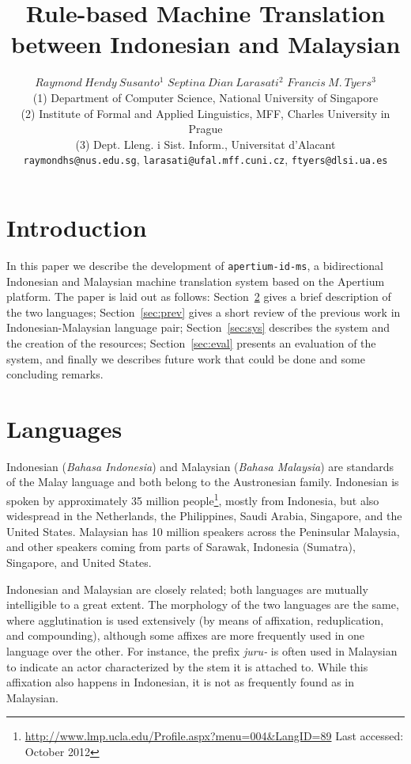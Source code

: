 \documentclass[10pt,a5paper,twoside]{article}
\title{Rule-based Machine Translation between Indonesian and Malaysian}
\author{$Raymond~Hendy~Susanto^{1}$
    $Septina~Dian~Larasati^{2}$
    $Francis~M.~Tyers^{3}$ \\
{\small  	(1) Department of Computer Science, National University of Singapore\\
(2) Institute of Formal and Applied Linguistics, MFF, Charles University in Prague\\
(3) Dept. Lleng. i Sist. Inform., Universitat d’Alacant\\
  \texttt{raymondhs@nus.edu.sg}, \texttt{larasati@ufal.mff.cuni.cz}, \texttt{ftyers@dlsi.ua.es}\\ 
}}
\begin{document}
\maketitle



\newpage
\section{Introduction}
In this paper we describe the development of \texttt{\small{apertium-id-ms}}, a bidirectional Indonesian and Malaysian machine translation system based on the Apertium platform. The paper is laid out as follows: Section~\ref{sec:lang} gives a brief description of the two languages; Section~\ref{sec:prev} gives a short review of the previous work in Indonesian-Malaysian language pair; Section~\ref{sec:sys} describes the system and the creation of the resources; Section~\ref{sec:eval} presents an evaluation of the system, and finally we describes future work that could be done and some concluding remarks.

\section{Languages}
\label{sec:lang}
Indonesian (\emph{Bahasa Indonesia}) and Malaysian (\emph{Bahasa Malaysia}) are standards of the Malay language and both belong to the Austronesian family. Indonesian is spoken by approximately 35 million people\footnote{\url{http://www.lmp.ucla.edu/Profile.aspx?menu=004&LangID=89} Last accessed: October 2012}, mostly from Indonesia, but also widespread in the Netherlands, the Philippines, Saudi Arabia, Singapore, and the United States. Malaysian has 10 million speakers across the Peninsular Malaysia, and other speakers coming from parts of Sarawak, Indonesia (Sumatra), Singapore, and United States.

Indonesian and Malaysian are closely related; both languages are mutually intelligible to a great extent. The morphology of the two languages are the same, where agglutination is used extensively (by means of affixation, reduplication, and compounding), although some affixes are more frequently used in one language over the other. For instance, the prefix \emph{juru-} is often used in Malaysian to indicate an actor characterized by the stem it is attached to. While this affixation also happens in Indonesian, it is not as frequently found as in Malaysian.
\end{document}
